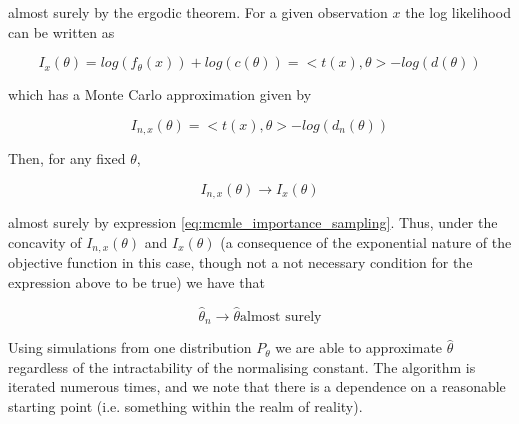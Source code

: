 almost surely by the ergodic theorem. For a given observation $x$ the log likelihood can be written as

\begin{equation}
I_x(\theta) = log(f_\theta(x)) + log(c(\theta)) = <t(x), \theta> - log(d(\theta))
\end{equation}

which has a Monte Carlo approximation given by 

\begin{equation}
I_{n,x}(\theta) = <t(x), \theta> - log(d_n(\theta))
\end{equation}

Then, for any fixed $\theta$,

\begin{equation}
I_{n,x}(\theta) \rightarrow I_x(\theta)
\end{equation}

almost surely by expression \ref{eq:mcmle_importance_sampling}. Thus, under the concavity of $I_{n,x}(\theta)$ and $I_x(\theta)$ (a consequence of the exponential nature of the objective function in this case, though not a not necessary condition for the expression above to be true) we have that 

\begin{equation}
\hat{\theta}_n \rightarrow \hat{\theta} \text{almost surely}
\end{equation}

Using simulations from one distribution $P_\theta$ we are able to approximate $\hat{\theta}$ regardless of the intractability of the normalising constant. The algorithm is iterated numerous times, and we note that there is a dependence on a reasonable starting point (i.e. something within the realm of reality). 


